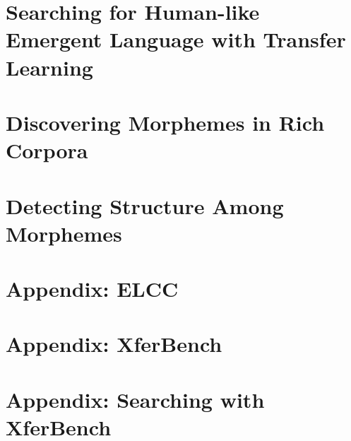 \chapter{Searching for Human-like Emergent Language with Transfer Learning }
\unskip\label{ch:hpo}



\chapter{Discovering Morphemes in Rich Corpora }
\unskip\label{ch:morphemes}


\chapter{Detecting Structure Among Morphemes }
\unskip\label{ch:syntax}







\appendix
{}

\chapter{Appendix: ELCC}


\chapter{Appendix: XferBench}


\chapter{Appendix: Searching with XferBench}




